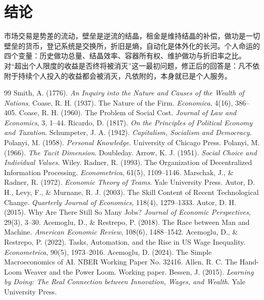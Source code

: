 \documentclass[11pt]{ctexart}
\begin{document}
\section{结论}
市场交易是势差的流动，壁垒是逆流的结晶，租金是维持结晶的补偿，做功是一切壁垒的货币，登记系统是交换所，折旧是熵，自动化是体外化的长河。个人命运的四个变量：历史做功总量、结晶效率、容器所有权、维护做功与折旧率之比。对“超出个人限度的收益是否终将被消灭”这一最初问题，修正后的回答是：凡不依附于持续个人投入的收益都会被消灭，凡依附的，本身就已是个人服务。

\begin{thebibliography}{99}\small
{} Smith, A. (1776). \textit{An Inquiry into the Nature and Causes of the Wealth of Nations}.
 Coase, R. H. (1937). The Nature of the Firm. \textit{Economica}, 4(16), 386--405.
 Coase, R. H. (1960). The Problem of Social Cost. \textit{Journal of Law and Economics}, 3, 1--44.
 Ricardo, D. (1817). \textit{On the Principles of Political Economy and Taxation}.
 Schumpeter, J. A. (1942). \textit{Capitalism, Socialism and Democracy}.
 Polanyi, M. (1958). \textit{Personal Knowledge}. University of Chicago Press.
 Polanyi, M. (1966). \textit{The Tacit Dimension}. Doubleday.
 Arrow, K. J. (1951). \textit{Social Choice and Individual Values}. Wiley.
 Radner, R. (1993). The Organization of Decentralized Information Processing. \textit{Econometrica}, 61(5), 1109--1146.
 Marschak, J., \& Radner, R. (1972). \textit{Economic Theory of Teams}. Yale University Press.
 Autor, D. H., Levy, F., \& Murnane, R. J. (2003). The Skill Content of Recent Technological Change. \textit{Quarterly Journal of Economics}, 118(4), 1279--1333.
 Autor, D. H. (2015). Why Are There Still So Many Jobs? \textit{Journal of Economic Perspectives}, 29(3), 3--30.
 Acemoglu, D., \& Restrepo, P. (2018). The Race between Man and Machine. \textit{American Economic Review}, 108(6), 1488--1542.
 Acemoglu, D., \& Restrepo, P. (2022). Tasks, Automation, and the Rise in US Wage Inequality. \textit{Econometrica}, 90(5), 1973--2016.
 Acemoglu, D. (2024). The Simple Macroeconomics of AI. NBER Working Paper No. 32416.
 Allen, R. C. The Hand-Loom Weaver and the Power Loom. Working paper.
 Bessen, J. (2015). \textit{Learning by Doing: The Real Connection between Innovation, Wages, and Wealth}. Yale University Press.

\end{thebibliography}
\end{document}
